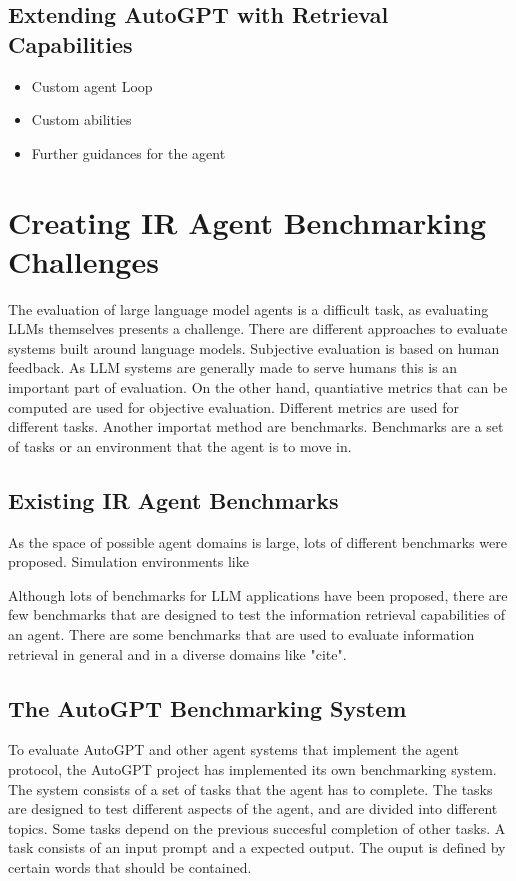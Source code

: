 \documentclass[english, version-2022-01]{uzl-thesis}
\begin{document}
\section{Extending AutoGPT with Retrieval Capabilities}

\begin{itemize}
	\item Custom agent Loop
	\item Custom abilities
	\item Further guidances for the agent
\end{itemize}

\chapter{Creating IR Agent Benchmarking Challenges}

The evaluation of large language model agents is a difficult task, as evaluating LLMs themselves presents a challenge.
There are different approaches to evaluate systems built around language models. Subjective evaluation is based on human feedback.
As LLM systems are generally made to serve humans this is an important part of evaluation.
On the other hand, quantiative metrics that can be computed are used for objective evaluation. Different metrics are used for different tasks. Another importat method are benchmarks.
Benchmarks are a set of tasks or an environment that the agent is to move in.

\section{Existing IR Agent Benchmarks}

As the space of possible agent domains is large, lots of different benchmarks were proposed. Simulation environments like

Although lots of benchmarks for LLM applications have been proposed, there are few benchmarks that are designed to test the information retrieval capabilities of an agent.
There are some benchmarks that are used to evaluate information retrieval in general and in a diverse domains like "cite".

\section{The AutoGPT Benchmarking System}

To evaluate AutoGPT and other agent systems that implement the agent protocol, the AutoGPT project has implemented its own benchmarking system.
The system consists of a set of tasks that the agent has to complete. The tasks are designed to test different aspects of the agent, and are divided into different topics.
Some tasks depend on the previous succesful completion of other tasks. A task consists of an input prompt and a expected output.
The ouput is defined by certain words that should be contained.
\end{document}
